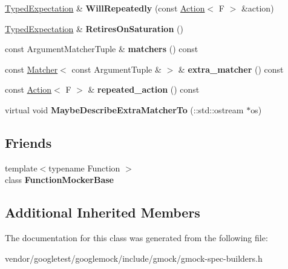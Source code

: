 \begin{DoxyCompactItemize}
\item 
\mbox{\label{classtesting_1_1internal_1_1_typed_expectation_a73586c1adb458c5c431df9679e46f5f1}} 
\mbox{\hyperlink{classtesting_1_1internal_1_1_typed_expectation}{Typed\+Expectation}} \& {\bfseries Will\+Repeatedly} (const \mbox{\hyperlink{classtesting_1_1_action}{Action}}$<$ F $>$ \&action)
\item 
\mbox{\label{classtesting_1_1internal_1_1_typed_expectation_ae7c42958a5d2c336ba7a42a871bf7709}} 
\mbox{\hyperlink{classtesting_1_1internal_1_1_typed_expectation}{Typed\+Expectation}} \& {\bfseries Retires\+On\+Saturation} ()
\item 
\mbox{\label{classtesting_1_1internal_1_1_typed_expectation_ad1a18c39511a2f6fda425881cddcc31a}} 
const Argument\+Matcher\+Tuple \& {\bfseries matchers} () const
\item 
\mbox{\label{classtesting_1_1internal_1_1_typed_expectation_a0ee00342b872ae257cae31bc86b9a34b}} 
const \mbox{\hyperlink{classtesting_1_1_matcher}{Matcher}}$<$ const Argument\+Tuple \& $>$ \& {\bfseries extra\+\_\+matcher} () const
\item 
\mbox{\label{classtesting_1_1internal_1_1_typed_expectation_a2b32621ac4d71c1a71893eb0499f723d}} 
const \mbox{\hyperlink{classtesting_1_1_action}{Action}}$<$ F $>$ \& {\bfseries repeated\+\_\+action} () const
\item 
\mbox{\label{classtesting_1_1internal_1_1_typed_expectation_ab019251041a408dc5a5d8ae216be53f4}} 
virtual void {\bfseries Maybe\+Describe\+Extra\+Matcher\+To} (\+::std\+::ostream $\ast$os)
\end{DoxyCompactItemize}
\subsection*{Friends}
\begin{DoxyCompactItemize}
\item 
\mbox{\label{classtesting_1_1internal_1_1_typed_expectation_a1771ea4a3d92d8b2ff0f0aa6fc40ff55}} 
{\footnotesize template$<$typename Function $>$ }\\class {\bfseries Function\+Mocker\+Base}
\end{DoxyCompactItemize}
\subsection*{Additional Inherited Members}


The documentation for this class was generated from the following file\+:\begin{DoxyCompactItemize}
\item 
vendor/googletest/googlemock/include/gmock/gmock-\/spec-\/builders.\+h\end{DoxyCompactItemize}
